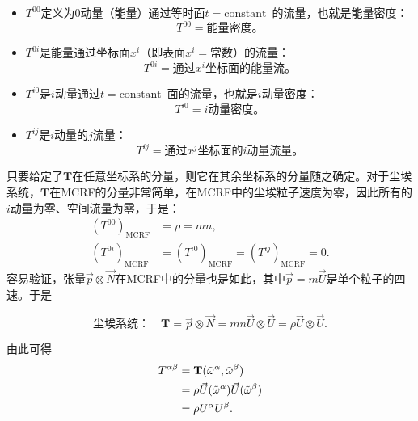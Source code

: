 \begin{itemize}
    \item $T^{00}$定义为0动量（能量）通过等时面$t = \text{constant}$\ 的流量，也就是能量密度：
    \begin{equation}
        T^{00} = \text{能量密度。}
    \label{equ4.15}
    \end{equation}
    \item $T^{0i}$是能量通过坐标面$x^i$（即表面$x^i = \text{常数}$）的流量：
    \begin{equation}
        T^{0i} = \text{通过$x^i$坐标面的能量流。}
    \label{equ4.16}
    \end{equation}
    \item $T^{i0}$是$i$动量通过$t = \text{constant}$\ 面的流量，也就是$i$动量密度：
    \begin{equation}
        T^{i0} = \text{$i$动量密度。}
    \label{equ4.17}
    \end{equation}
    \item $T^{ij}$是$i$动量的$j$流量：
    \begin{equation}
        T^{ij} = \text{通过$x^j$坐标面的$i$动量流量。}
    \label{equ4.18}
    \end{equation}
\end{itemize}
只要给定了$\mathbf{T}$在任意坐标系的分量，则它在其余坐标系的分量随之确定。对于尘埃系统，$\mathbf{T}$在MCRF的分量非常简单，在MCRF中的尘埃粒子速度为零，因此所有的$i$动量为零、空间流量为零，于是：
\begin{align*}
    (T^{00})_{\text{MCRF}} &= \rho = mn, \\
    (T^{0i})_{\text{MCRF}} &= (T^{i0})_{\text{MCRF}} = (T^{ij})_{\text{MCRF}} = 0.
\end{align*}
容易验证，张量$\vec{p} \otimes \vec{N}$在MCRF中的分量也是如此，其中$\vec{p} = m\vec{U}$是单个粒子的四速。于是
\begin{shaded}
\begin{equation}
    \text{尘埃系统：}\quad \mathbf{T} = \vec{p} \otimes \vec{N} = mn \vec{U} \otimes \vec{U} = \rho \vec{U} \otimes \vec{U}.
\label{equ4.19}
\end{equation}
\end{shaded}
由此可得
\begin{align}
    T^{\alpha \beta} &= \mathbf{T} (\tilde{\omega}^\alpha, \tilde{\omega}^\beta) \notag \\
    &= \rho \vec{U} (\tilde{\omega}^\alpha) \vec{U} (\tilde{\omega}^\beta) \notag \\
    &= \rho U^\alpha U^\beta. \label{equ4.20}
\end{align}

